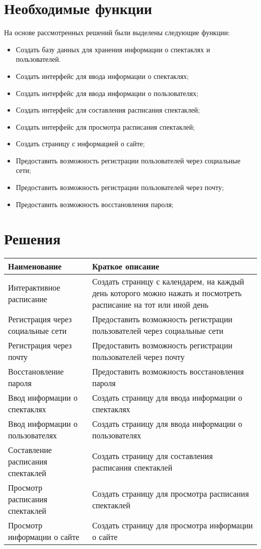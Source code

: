 \section{Необходимые функции}
На основе рассмотренных решений были выделены следующие функции:
\begin{itemize}
	\item Создать базу данных для хранения информации о спектаклях и пользователей.
	\item Создать интерфейс для ввода информации о спектаклях;
	\item Создать интерфейс для ввода информации о пользователях;
	\item Создать интерфейс для составления расписания спектаклей;
	\item Создать интерфейс для просмотра расписания спектаклей;
	\item Создать страницу с информацией о сайте;
	\item Предоставить возможность регистрации пользователей через социальные сети;
	\item Предоставить возможность регистрации пользователей через почту;
	\item Предоставить возможность восстановления пароля;
\end{itemize}
\newpage

\section{Решения}

\begin{center}
	\begin{tabular}{|p{}|p{}|}
		\hline
		\textbf{Наименование} & \textbf{Краткое описание} \\ \hline
		Интерактивное расписание & Создать страницу с календарем, на каждый день которого можно нажать и посмотреть расписание  на тот или иной день \\ \hline
		Регистрация через социальные сети & Предоставить возможность регистрации пользователей через социальные сети \\ \hline
		Регистрация через почту & Предоставить возможность регистрации пользователей через почту \\ \hline
		Восстановление пароля & Предоставить возможность восстановления пароля \\ \hline
		Ввод информации о спектаклях & Создать страницу для ввода информации о спектаклях \\ \hline
		Ввод информации о пользователях & Создать страницу для ввода информации о пользователях \\ \hline
		Составление расписания спектаклей & Создать страницу для составления расписания спектаклей \\ \hline
		Просмотр расписания спектаклей & Создать страницу для просмотра расписания спектаклей \\ \hline
		Просмотр информации о сайте & Создать страницу для просмотра информации о сайте \\ \hline
	\end{tabular}
\end{center}
\newpage

